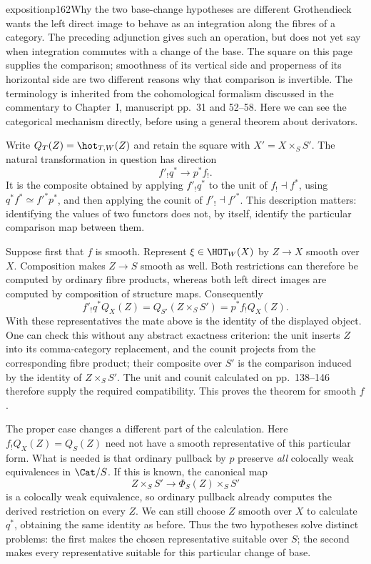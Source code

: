 \begin{dcomment}{exposition}{p162}{Why the two base-change hypotheses are different}
Grothendieck wants the left direct image to behave as an integration along the fibres of a category. The preceding adjunction gives such an operation, but does not yet say when integration commutes with a change of the base. The square on this page supplies the comparison; smoothness of its vertical side and properness of its horizontal side are two different reasons why that comparison is invertible. The terminology is inherited from the cohomological formalism discussed in the commentary to Chapter~I, manuscript pp.~31 and 52--58. Here we can see the categorical mechanism directly, before using a general theorem about derivators.

Write $Q_T(Z)=\hot_{T,W}(Z)$ and retain the square with $X'=X\times_S S'$. The natural transformation in question has direction
\[
 f'_!q^*\longrightarrow p^*f_!.
\]
It is the composite obtained by applying $f'_!q^*$ to the unit of $f_!\dashv f^*$, using $q^*f^*\simeq f'^*p^*$, and then applying the counit of $f'_!\dashv f'^*$. This description matters: identifying the values of two functors does not, by itself, identify the particular comparison map between them.

Suppose first that $f$ is smooth. Represent $\xi\in\HOT_W(X)$ by $Z\to X$ smooth over $X$. Composition makes $Z\to S$ smooth as well. Both restrictions can therefore be computed by ordinary fibre products, whereas both left direct images are computed by composition of structure maps. Consequently
\[
 f'_!q^*Q_X(Z)=Q_{S'}(Z\times_S S')=p^*f_!Q_X(Z).
\]
With these representatives the mate above is the identity of the displayed object. One can check this without any abstract exactness criterion: the unit inserts $Z$ into its comma-category replacement, and the counit projects from the corresponding fibre product; their composite over $S'$ is the comparison induced by the identity of $Z\times_S S'$. The unit and counit calculated on pp.~138--146 therefore supply the required compatibility. This proves the theorem for smooth $f$.

The proper case changes a different part of the calculation. Here $f_!Q_X(Z)=Q_S(Z)$ need not have a smooth representative of this particular form. What is needed is that ordinary pullback by $p$ preserve \emph{all} colocally weak equivalences in $\Cat/S$. If this is known, the canonical map
\[
 Z\times_S S'\longrightarrow\Phi_S(Z)\times_S S'
\]
is a colocally weak equivalence, so ordinary pullback already computes the derived restriction on every $Z$. We can still choose $Z$ smooth over $X$ to calculate $q^*$, obtaining the same identity as before. Thus the two hypotheses solve distinct problems: the first makes the chosen representative suitable over $S$; the second makes every representative suitable for this particular change of base.


\end{dcomment}
